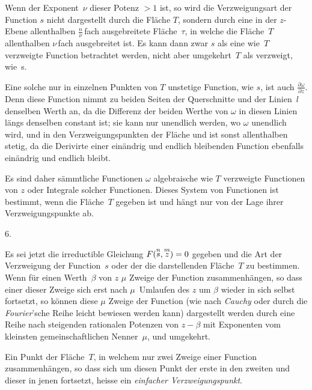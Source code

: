 \documentclass[a4paper,12pt,leqno]{article}
\begin{document}
Wenn der Exponent~$\nu$ dieser Potenz $> 1$ ist, so wird die
Verzweigungsart der Function $s$ nicht dargestellt durch die
Fl\"{a}che $T$, sondern durch eine in der $z$-Ebene allenthalben
$\displaystyle\frac{n}{\nu} \,$\-fach
ausgebreitete Fl\"{a}che~$\tau$, in welche die Fl\"{a}che~$T$
allenthalben $\nu \,$\-fach ausgebreitet ist.  Es kann dann zwar $s$
als eine wie~$T$ verzweigte Function betrachtet werden, nicht aber
umgekehrt~$T$ als verzweigt, wie~s.

Eine solche nur in einzelnen Punkten von $T$ unstetige Function,
wie $s$, ist auch
$\displaystyle\frac{\partial \omega}{\partial z}$.
Denn diese Function nimmt zu beiden Seiten der Querschnitte und
der Linien~$l$ denselben Werth an, da die Differenz der beiden
Werthe von $\omega$ in diesen Linien l\"{a}ngs denselben constant
ist; sie kann nur unendlich werden, wo $\omega$ unendlich wird,
und in den Verzweigungspunkten der Fl\"{a}che und ist sonst
allenthalben stetig, da die Derivirte einer ein\"{a}ndrig und
endlich bleibenden Function ebenfalls ein\"{a}ndrig und endlich
bleibt.

Es sind daher s\"{a}mmtliche Functionen $\omega$ algebraische wie
$T$ verzweigte Functionen von $z$ oder Integrale solcher
Functionen.  Dieses System von Functionen ist bestimmt, wenn die
Fl\"{a}che~$T$ gegeben ist und h\"{a}ngt nur von der Lage ihrer
Verzweigungspunkte ab.

\medbreak

\centerline{6.}

\nobreak\medskip

Es sei jetzt die irreductible Gleichung
$F( {\buildrel n \over s}, {\buildrel m \over z} ) = 0$
gegeben und die Art der Verzweigung der Function~$s$ oder der die
darstellenden Fl\"{a}che~$T$ zu bestimmen.  Wenn f\"{u}r einen
Werth~$\beta$ von $z$ $\mu$ Zweige der Function
zusammenh\"{a}ngen, so dass einer dieser Zweige sich erst nach
$\mu$~Umlaufen des $z$ um $\beta$ wieder in sich selbst
fortsetzt, so k\"{o}nnen diese $\mu$ Zweige der Function (wie
nach \emph{Cauchy} oder durch die \emph{Fourier}'sche Reihe
leicht bewiesen werden kann) dargestellt werden durch eine Reihe
nach steigenden rationalen Potenzen von $z - \beta$ mit
Exponenten vom kleinsten gemeinschaftlichen Nenner~$\mu$, und
umgekehrt.

Ein Punkt der Fl\"{a}che~$T$, in welchem nur zwei Zweige einer
Function zusammenh\"{a}ngen, so dass sich um diesen Punkt der
erste in den zweiten und dieser in jenen fortsetzt, heisse ein
\emph{einfacher Verzweigungspunkt}.
\end{document}
